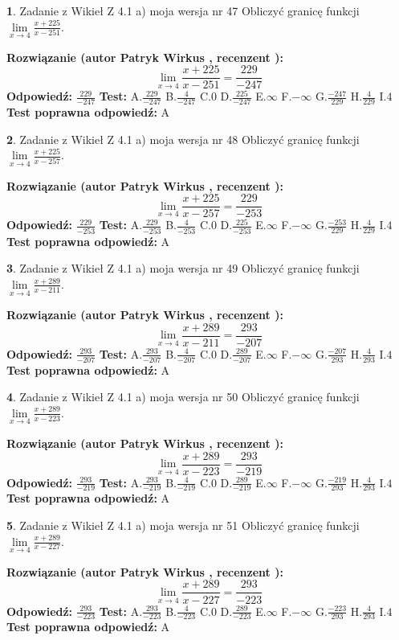 \documentclass[12pt, a4paper]{article}
\theoremstyle{definition} %
\newtheorem{zad}{}
\newcommand{\zadStart}[1]{\begin{zad}#1\newline}
\newcommand{\zadStop}{\end{zad}}
\newcommand{\rozwStart}[2]{\noindent \textbf{Rozwiązanie (autor #1 , recenzent #2): }\newline}
\newcommand{\rozwStop}{\newline}
\newcommand{\odpStart}{\noindent \textbf{Odpowiedź:}\newline}
\newcommand{\odpStop}{\newline}
\newcommand{\testStart}{\noindent \textbf{Test:}\newline}
\newcommand{\testStop}{\newline}
\newcommand{\kluczStart}{\noindent \textbf{Test poprawna odpowiedź:}\newline}
\newcommand{\kluczStop}{\newline}
\begin{document}
\zadStart{Zadanie z Wikieł Z 4.1 a) moja wersja nr 47}
Obliczyć granicę funkcji $\lim\limits_{x\to4}\frac{x+225}{x-251}$.
\zadStop
\rozwStart{Patryk Wirkus}{}
$$\lim\limits_{x\to4}\frac{x+225}{x-251} = \frac{229}{-247}$$
\rozwStop
\odpStart
$\frac{229}{-247}$
\odpStop
\testStart
A.$\frac{229}{-247}$
B.$\frac{4}{-247}$
C.$0$
D.$\frac{225}{-247}$
E.$\infty$
F.$-\infty$
G.$\frac{-247}{229}$
H.$\frac{4}{229}$
I.$4$
\testStop
\kluczStart
A
\kluczStop



\zadStart{Zadanie z Wikieł Z 4.1 a) moja wersja nr 48}
Obliczyć granicę funkcji $\lim\limits_{x\to4}\frac{x+225}{x-257}$.
\zadStop
\rozwStart{Patryk Wirkus}{}
$$\lim\limits_{x\to4}\frac{x+225}{x-257} = \frac{229}{-253}$$
\rozwStop
\odpStart
$\frac{229}{-253}$
\odpStop
\testStart
A.$\frac{229}{-253}$
B.$\frac{4}{-253}$
C.$0$
D.$\frac{225}{-253}$
E.$\infty$
F.$-\infty$
G.$\frac{-253}{229}$
H.$\frac{4}{229}$
I.$4$
\testStop
\kluczStart
A
\kluczStop



\zadStart{Zadanie z Wikieł Z 4.1 a) moja wersja nr 49}
Obliczyć granicę funkcji $\lim\limits_{x\to4}\frac{x+289}{x-211}$.
\zadStop
\rozwStart{Patryk Wirkus}{}
$$\lim\limits_{x\to4}\frac{x+289}{x-211} = \frac{293}{-207}$$
\rozwStop
\odpStart
$\frac{293}{-207}$
\odpStop
\testStart
A.$\frac{293}{-207}$
B.$\frac{4}{-207}$
C.$0$
D.$\frac{289}{-207}$
E.$\infty$
F.$-\infty$
G.$\frac{-207}{293}$
H.$\frac{4}{293}$
I.$4$
\testStop
\kluczStart
A
\kluczStop



\zadStart{Zadanie z Wikieł Z 4.1 a) moja wersja nr 50}
Obliczyć granicę funkcji $\lim\limits_{x\to4}\frac{x+289}{x-223}$.
\zadStop
\rozwStart{Patryk Wirkus}{}
$$\lim\limits_{x\to4}\frac{x+289}{x-223} = \frac{293}{-219}$$
\rozwStop
\odpStart
$\frac{293}{-219}$
\odpStop
\testStart
A.$\frac{293}{-219}$
B.$\frac{4}{-219}$
C.$0$
D.$\frac{289}{-219}$
E.$\infty$
F.$-\infty$
G.$\frac{-219}{293}$
H.$\frac{4}{293}$
I.$4$
\testStop
\kluczStart
A
\kluczStop



\zadStart{Zadanie z Wikieł Z 4.1 a) moja wersja nr 51}
Obliczyć granicę funkcji $\lim\limits_{x\to4}\frac{x+289}{x-227}$.
\zadStop
\rozwStart{Patryk Wirkus}{}
$$\lim\limits_{x\to4}\frac{x+289}{x-227} = \frac{293}{-223}$$
\rozwStop
\odpStart
$\frac{293}{-223}$
\odpStop
\testStart
A.$\frac{293}{-223}$
B.$\frac{4}{-223}$
C.$0$
D.$\frac{289}{-223}$
E.$\infty$
F.$-\infty$
G.$\frac{-223}{293}$
H.$\frac{4}{293}$
I.$4$
\testStop
\kluczStart
A
\kluczStop
\end{document}

